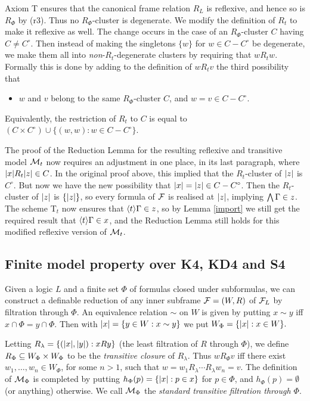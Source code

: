 Axiom T ensures that the canonical frame relation $R_L$ is reflexive, and hence so is $R_\Phi$ by (r3). Thus no $R_\Phi$-cluster is degenerate.
We modify the definition of $R_t$ to make it  reflexive as well. The change occurs in the case of an $R_\Phi$-cluster $C$ having $C\ne C^\circ$. Then instead of making the singletons $\{w\}$ for $w\in C-C^\circ$ be degenerate, we make them all into \emph{non}-$R_t$-degenerate clusters by requiring that $wR_tw$. Formally this is done by adding to the definition of $wR_tv$ the third possibility that
\begin{itemize}
\item 
$w$ and $v$ belong to the same $R_\Phi$-cluster $C$, and $w=v\in C-C^\circ$.
\end{itemize}
Equivalently, the restriction of $R_t$ to $C$ is equal to $(C\times C^\circ) \cup\{(w,w):w\in C-C^\circ\}$.


The proof of the Reduction Lemma  for the resulting reflexive and transitive model $\mathcal{M}_t$ now requires an adjustment in one place, in its last paragraph, where $|x|R_t|z|\in C$. In the original proof above, this implied that the $R_t$-cluster of $|z|$ is $C^\circ$. But now we have the new possibility  that $|x|=|z|\in C-C^\circ$. Then the $R_t$-cluster of $|z|$ is $\{|z|\}$, so every formula of $\mathcal{F}$ is realised at $|z|$, implying $\bigwedge\Gamma\in z$.
The  scheme T$_t$ now
 ensures that $\langle t\rangle\Gamma\in z$, so  by Lemma \ref{import}  we still get the required result that $\langle t\rangle\Gamma\in x$, and the Reduction Lemma still holds for this modified reflexive version of $\mathcal{M}_t$.
 
 
 \subsection{Finite model property over K4, KD4 and S4}\label{sec:fmp S4}
 
 Given a logic $L$ and a finite set $\Phi$ of formulas closed under subformulas, 
we can construct a definable reduction of any  inner subframe  $\mathcal{F}=(W,R)$ of $\mathcal{F}_L$    by  filtration through 
$\Phi$. An equivalence relation $\sim$ on $W$ is given by putting $x\sim y$ iff $x\cap\Phi=y\cap\Phi$. 
Then with $|x|=\{y\in W:x\sim y\}$ we put  $W_\Phi=\{|x|:x\in W\}.$
 
Letting $R_\lambda=\{(|x|,|y|):xRy\}$ (the least filtration of $R$  through $\Phi$), we define
 $R_\Phi\subseteq W_\Phi\times W_\Phi$ to be the \emph{transitive closure} of $R_\lambda$.
Thus $wR_\Phi v$ iff there exist $w_1,\dots, w_n\in W_\Phi$, for some $n>1$, such that 
$w=w_1R_\lambda\cdots R_\lambda w_n=v$. The definition of $\mathcal{M}_\Phi$ is completed by putting
$h_\Phi(p)=\{|x|: p\in x\}$ for $p\in\Phi$, and $h_\Phi(p)=\emptyset$ (or anything) otherwise. We call $\mathcal{M}_\Phi$ the
\emph{standard transitive filtration through $\Phi$}.

